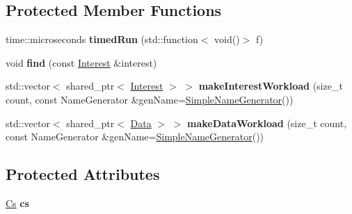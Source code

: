 \subsection*{Protected Member Functions}
\begin{DoxyCompactItemize}
\item 
time\+::microseconds {\bfseries timed\+Run} (std\+::function$<$ void()$>$ f)\hypertarget{classnfd_1_1tests_1_1CsBenchmarkFixture_a04587ac4030249af8eea15a526917442}{}\label{classnfd_1_1tests_1_1CsBenchmarkFixture_a04587ac4030249af8eea15a526917442}

\item 
void {\bfseries find} (const \hyperlink{classndn_1_1Interest}{Interest} \&interest)\hypertarget{classnfd_1_1tests_1_1CsBenchmarkFixture_a16ddf197396b4d8b837081f2d4e5c5ff}{}\label{classnfd_1_1tests_1_1CsBenchmarkFixture_a16ddf197396b4d8b837081f2d4e5c5ff}

\item 
std\+::vector$<$ shared\+\_\+ptr$<$ \hyperlink{classndn_1_1Interest}{Interest} $>$ $>$ {\bfseries make\+Interest\+Workload} (size\+\_\+t count, const Name\+Generator \&gen\+Name=\hyperlink{classnfd_1_1tests_1_1CsBenchmarkFixture_1_1SimpleNameGenerator}{Simple\+Name\+Generator}())\hypertarget{classnfd_1_1tests_1_1CsBenchmarkFixture_a242a5780bcb7b0201a49c954b37c49fb}{}\label{classnfd_1_1tests_1_1CsBenchmarkFixture_a242a5780bcb7b0201a49c954b37c49fb}

\item 
std\+::vector$<$ shared\+\_\+ptr$<$ \hyperlink{classndn_1_1Data}{Data} $>$ $>$ {\bfseries make\+Data\+Workload} (size\+\_\+t count, const Name\+Generator \&gen\+Name=\hyperlink{classnfd_1_1tests_1_1CsBenchmarkFixture_1_1SimpleNameGenerator}{Simple\+Name\+Generator}())\hypertarget{classnfd_1_1tests_1_1CsBenchmarkFixture_ac02dba29973d93ee0cf0a678030c4f61}{}\label{classnfd_1_1tests_1_1CsBenchmarkFixture_ac02dba29973d93ee0cf0a678030c4f61}

\end{DoxyCompactItemize}
\subsection*{Protected Attributes}
\begin{DoxyCompactItemize}
\item 
\hyperlink{classnfd_1_1cs_1_1Cs}{Cs} {\bfseries cs}\hypertarget{classnfd_1_1tests_1_1CsBenchmarkFixture_ac092ed58eb2b598ad3c248e772916fb2}{}\label{classnfd_1_1tests_1_1CsBenchmarkFixture_ac092ed58eb2b598ad3c248e772916fb2}

\end{DoxyCompactItemize}
